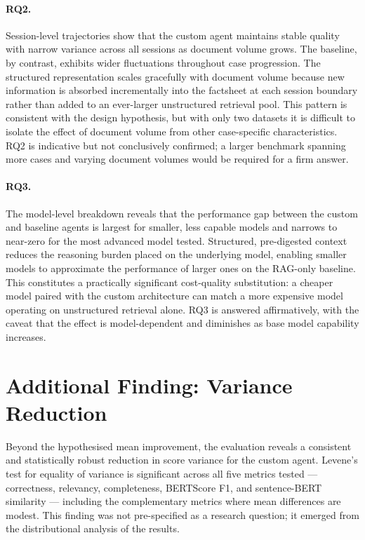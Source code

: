 \paragraph{RQ2.}
Session-level trajectories show that the custom agent maintains stable quality with
narrow variance across all sessions as document volume grows. The baseline, by contrast,
exhibits wider fluctuations throughout case progression. The structured representation
scales gracefully with document volume because new information is absorbed incrementally
into the factsheet at each session boundary rather than added to an ever-larger
unstructured retrieval pool. This pattern is consistent with the design hypothesis, but
with only two datasets it is difficult to isolate the effect of document volume from
other case-specific characteristics. RQ2 is indicative but not conclusively confirmed;
a larger benchmark spanning more cases and varying document volumes would be required
for a firm answer.

\paragraph{RQ3.}
The model-level breakdown reveals that the performance gap between the custom and
baseline agents is largest for smaller, less capable models and narrows to near-zero
for the most advanced model tested. Structured, pre-digested context reduces the
reasoning burden placed on the underlying model, enabling smaller models to approximate
the performance of larger ones on the RAG-only baseline. This constitutes a practically
significant cost-quality substitution: a cheaper model paired with the custom architecture
can match a more expensive model operating on unstructured retrieval alone. RQ3 is
answered affirmatively, with the caveat that the effect is model-dependent and diminishes
as base model capability increases.

\section{Additional Finding: Variance Reduction}

Beyond the hypothesised mean improvement, the evaluation reveals a consistent and
statistically robust reduction in score variance for the custom agent. Levene's test
for equality of variance is significant across all five metrics tested --- correctness,
relevancy, completeness, BERTScore F1, and sentence-BERT similarity --- including the
complementary metrics where mean differences are modest. This finding was not
pre-specified as a research question; it emerged from the distributional analysis of
the results.

